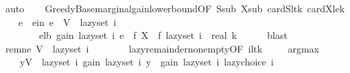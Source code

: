 \begin{isabellebody}
\ auto\isanewline
\isanewline
\ \ \isamarkupfalse%
\ Greedy{\isacharunderscore}{\kern0pt}Base{\isachardot}{\kern0pt}marginal{\isacharunderscore}{\kern0pt}gain{\isacharunderscore}{\kern0pt}lower{\isacharunderscore}{\kern0pt}bound{\isacharbrackleft}{\kern0pt}OF\ S{\isacharunderscore}{\kern0pt}sub\ X{\isacharunderscore}{\kern0pt}sub\ cardS{\isacharunderscore}{\kern0pt}lt{\isacharunderscore}{\kern0pt}k\ cardX{\isacharunderscore}{\kern0pt}le{\isacharunderscore}{\kern0pt}k{\isacharbrackright}{\kern0pt}\isanewline
\ \ \isamarkupfalse%
\ e\ \ e{\isacharunderscore}{\kern0pt}in{\isacharcolon}{\kern0pt}\ {\isachardoublequoteopen}e\ {\isasymin}\ V\ {\isacharminus}{\kern0pt}\ lazy{\isacharunderscore}{\kern0pt}set\ i{\isachardoublequoteclose}\isanewline
\ \ \ \ \ \ \ \ e{\isacharunderscore}{\kern0pt}lb{\isacharcolon}{\kern0pt}\ {\isachardoublequoteopen}gain\ {\isacharparenleft}{\kern0pt}lazy{\isacharunderscore}{\kern0pt}set\ i{\isacharparenright}{\kern0pt}\ e\ {\isasymge}\ {\isacharparenleft}{\kern0pt}f\ X\ {\isacharminus}{\kern0pt}\ f\ {\isacharparenleft}{\kern0pt}lazy{\isacharunderscore}{\kern0pt}set\ i{\isacharparenright}{\kern0pt}{\isacharparenright}{\kern0pt}\ {\isacharslash}{\kern0pt}\ real\ k{\isachardoublequoteclose}\isanewline
\ \ \ \ \isamarkupfalse%
\ blast\isanewline
\isanewline
\ \ \isamarkupfalse%
\ rem{\isacharunderscore}{\kern0pt}ne{\isacharcolon}{\kern0pt}\ {\isachardoublequoteopen}V\ {\isacharminus}{\kern0pt}\ lazy{\isacharunderscore}{\kern0pt}set\ i\ {\isasymnoteq}\ {\isacharbraceleft}{\kern0pt}{\isacharbraceright}{\kern0pt}{\isachardoublequoteclose}\isanewline
\ \ \ \ \isamarkupfalse%
\ lazy{\isacharunderscore}{\kern0pt}remainder{\isacharunderscore}{\kern0pt}nonempty{\isacharbrackleft}{\kern0pt}OF\ i{\isacharunderscore}{\kern0pt}lt{\isacharunderscore}{\kern0pt}k{\isacharbrackright}{\kern0pt}\ \isakeywordONE{{\isachardot}{\kern0pt}}\isamarkupfalse%
\isanewline
\isanewline
\ \ \isamarkupfalse%
\ argmax{\isacharcolon}{\kern0pt}\isanewline
\ \ \ \ {\isachardoublequoteopen}{\isasymforall}y{\isasymin}V\ {\isacharminus}{\kern0pt}\ lazy{\isacharunderscore}{\kern0pt}set\ i{\isachardot}{\kern0pt}\ gain\ {\isacharparenleft}{\kern0pt}lazy{\isacharunderscore}{\kern0pt}set\ i{\isacharparenright}{\kern0pt}\ y\ {\isasymle}\ gain\ {\isacharparenleft}{\kern0pt}lazy{\isacharunderscore}{\kern0pt}set\ i{\isacharparenright}{\kern0pt}\ {\isacharparenleft}{\kern0pt}lazy{\isacharunderscore}{\kern0pt}choice\ i{\isacharparenright}{\kern0pt}{\isachardoublequoteclose}\isanewline

\end{isabellebody}
